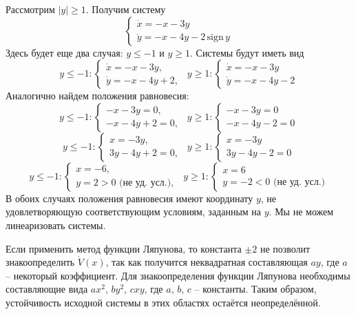 \documentclass[a4paper, 12pt]{article}
\begin{document}
    Рассмотрим $|y|\geq1$. Получим систему
    $$
    \begin{cases}
        \dot{x}=-x-3y\\
        \dot{y}=-x-4y-2\,\text{sign}\,y
    \end{cases}
    $$
    Здесь будет еще два случая: $y\leq-1$ и $y\geq1$. Системы будут иметь вид
    $$
    y\leq-1:
    \begin{cases}
        \dot{x}=-x-3y,\\
        \dot{y}=-x-4y+2,
    \end{cases}\ \ 
    y\geq1:
    \begin{cases}
        \dot{x}=-x-3y\\
        \dot{y}=-x-4y-2
    \end{cases}
    $$
    Аналогично найдем положения равновесия:
    $$
    y\leq-1:
    \begin{cases}
        -x-3y=0,\\
        -x-4y+2=0,
    \end{cases}\ \ 
    y\geq1:
    \begin{cases}
        -x-3y=0\\
        -x-4y-2=0
    \end{cases}
    $$
    $$
    y\leq-1:
    \begin{cases}
        x=-3y,\\
        3y-4y+2=0,
    \end{cases}\ \ 
    y\geq1:
    \begin{cases}
        x=-3y\\
        3y-4y-2=0
    \end{cases}
    $$
    $$
    y\leq-1:
    \begin{cases}
        x=-6,\\
        y=2>0\text{ (не уд. усл.)},
    \end{cases}\ \ 
    y\geq1:
    \begin{cases}
        x=6\\
        y=-2<0\text{ (не уд. усл.)}
    \end{cases}
    $$
    В обоих случаях положения равновесия имеют координату $y$, не удовлетворяющую соответствующим условиям, заданным на $y$.
    Мы не можем линеаризовать системы.
    
    Если применить метод функции Ляпунова, то константа $\pm2$ не позволит
    знакоопределить $\dot{V}(x)$, так как получится неквадратная составляющая $ay$, где $a$ -- некоторый коэффициент.
    Для знакоопределения функции Ляпунова необходимы составляющие вида $ax^2,\,by^2,\,cxy$, где $a,\,b,\,c$ -- константы.
    Таким образом, устойчивость исходной системы в этих областях остаётся неопределённой.
\end{document}
